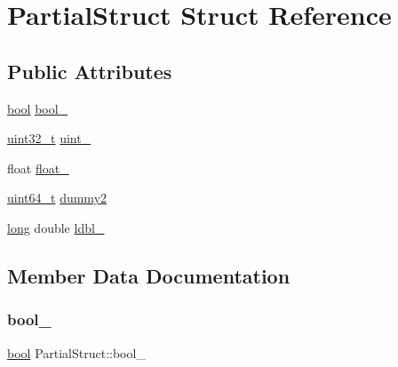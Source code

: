 \hypertarget{struct_partial_struct}{}\section{Partial\+Struct Struct Reference}
\label{struct_partial_struct}
\subsection*{Public Attributes}
\begin{DoxyCompactItemize}
\item 
\mbox{\hyperlink{asdl_8h_af6a258d8f3ee5206d682d799316314b1}{bool}} \mbox{\hyperlink{struct_partial_struct_a776848f4c18500da85cabdeba2c28737}{bool\+\_\+}}
\item 
\mbox{\hyperlink{_s_d_l__config_8h_a435d1572bf3f880d55459d9805097f62}{uint32\+\_\+t}} \mbox{\hyperlink{struct_partial_struct_a08db7a5396c67e8a721c3b06ce6e97b9}{uint\+\_\+}}
\item 
float \mbox{\hyperlink{struct_partial_struct_aa8c12e2641a168436ae5fe5252fac932}{float\+\_\+}}
\item 
\mbox{\hyperlink{_s_d_l__config_8h_aaa5d1cd013383c889537491c3cfd9aad}{uint64\+\_\+t}} \mbox{\hyperlink{struct_partial_struct_a271356a7b52bdab2d82522876c8a923c}{dummy2}}
\item 
\mbox{\hyperlink{modsupport_8h_a0cb68e00fb9fb1260ee2daadd9fe6611}{long}} double \mbox{\hyperlink{struct_partial_struct_ac4484296d436d98225a7f7c3d9ce4f27}{ldbl\+\_\+}}
\end{DoxyCompactItemize}


\subsection{Member Data Documentation}
\mbox{\label{struct_partial_struct_a776848f4c18500da85cabdeba2c28737}} 
\subsubsection{\texorpdfstring{bool\_}{bool\_}}
{\footnotesize\ttfamily \mbox{\hyperlink{asdl_8h_af6a258d8f3ee5206d682d799316314b1}{bool}} Partial\+Struct\+::bool\+\_\+}

\mbox{\label{struct_partial_struct_a271356a7b52bdab2d82522876c8a923c}} 
